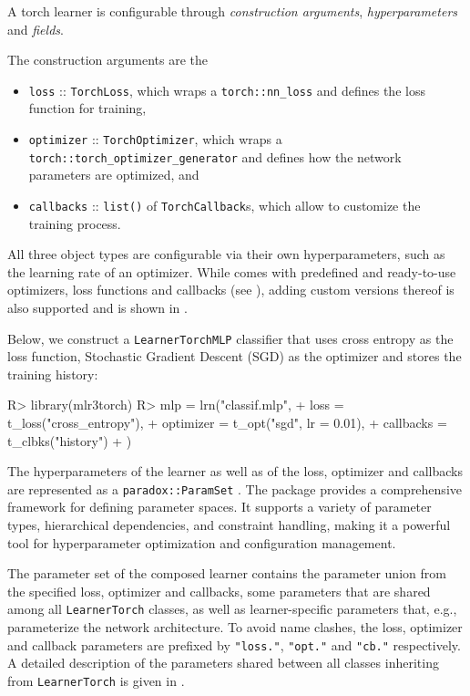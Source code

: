 \documentclass[article, nojss]{jss}
\theoremstyle{definition}
\begin{document}
A torch learner is configurable through \emph{construction arguments}, \emph{hyperparameters} and \emph{fields}.

The construction arguments are the
\begin{itemize}
    \item \texttt{loss} :: \texttt{TorchLoss}, which wraps a \texttt{torch::nn\_loss} and defines the loss function for training,
    \item \texttt{optimizer} :: \texttt{TorchOptimizer}, which wraps a \texttt{torch::torch\_optimizer\_generator} and defines how the network parameters are optimized, and 
    \item \texttt{callbacks} :: \texttt{list()} of \texttt{TorchCallback}s, which allow to customize the training process.
\end{itemize}

All three object types are configurable via their own hyperparameters, such as the learning rate of an optimizer.
While  comes with predefined and ready-to-use optimizers, loss functions and callbacks (see ), adding custom versions thereof is also supported and is shown in .

Below, we construct a \texttt{LearnerTorchMLP} classifier that uses cross entropy as the loss function, Stochastic Gradient Descent (SGD) as the optimizer and stores the training history:

\begin{CodeInput}
R> library(mlr3torch)
R> mlp = lrn("classif.mlp",
+   loss = t_loss("cross_entropy"),
+   optimizer = t_opt("sgd", lr = 0.01),
+   callbacks = t_clbks("history")
+ )
\end{CodeInput}

The hyperparameters of the learner as well as of the loss, optimizer and callbacks are represented as a \texttt{paradox::ParamSet} \citep{ref-paradox2024}.
The  package provides a comprehensive framework for defining parameter spaces.
It supports a variety of parameter types, hierarchical dependencies, and constraint handling, making it a powerful tool for hyperparameter optimization and configuration management.

The parameter set of the composed learner contains the parameter union from the specified loss, optimizer and callbacks, some parameters that are shared among all \texttt{LearnerTorch} classes, as well as learner-specific parameters that, e.g., parameterize the network architecture.
To avoid name clashes, the loss, optimizer and callback parameters are prefixed by \texttt{"loss."}, \texttt{"opt."}  and \texttt{"cb."} respectively.
A detailed description of the parameters shared between all classes inheriting from \texttt{LearnerTorch} is given in .
\end{document}
